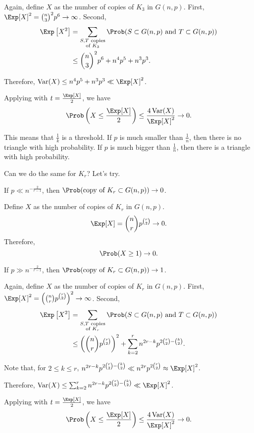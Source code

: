 \begin{dem}
	Again, define $X$ as the number of copies of $K_3$ in $G(n, p)$. First, $\Exp[X]^2 = \binom{n}{3}^2p^6 \to \infty$. Second,
	\begin{align*} \Exp\left[X^2\right] &= \sum_{\substack{S, T\text{ copies}\\\text{of }K_3}} \Prob(S \subset G(n, p) \text{ and } T \subset G(n, p)) \\
		&\le \binom{n}{3}^2p^6 + n^4p^5 + n^3p^3.
	\end{align*}

	Therefore, $\Var(X) \le n^4p^5 + n^3p^3 \ll \Exp[X]^2$.
	
	Applying  with $t = \frac{\Exp[X]}{2}$, we have
	\[
		\Prob\left(X \le \frac{\Exp[X]}{2}\right) \le \frac{4\Var(X)}{\Exp[X]^2} \to 0.
	\]
\end{dem}

This means that $\frac{1}{k}$ is a threshold. If $p$ is much smaller than $\frac{1}{n}$, then there is no triangle with high probability. If $p$ is much bigger than $\frac{1}{n}$, then there is a triangle with high probability. 

Can we do the same for $K_r$? Let's try.

\begin{prop}
	If $p \ll n^{-\frac{2}{r-1}}$, then $\Prob(\text{copy of } K_r \subset G(n, p)) \to 0$.
\end{prop}

\begin{dem}
	Define $X$ as the number of copies of $K_r$ in $G(n, p)$. \[ \Exp[X] = \binom{n}{r} p^{\binom{r}{2}} \to 0.\]
	Therefore, \[ \Prob(X \ge 1) \to 0.\]	
\end{dem}


\begin{prop}
	If $p \gg n^{-\frac{2}{r-1}}$, then $\Prob(\text{copy of } K_r \subset G(n, p)) \to 1$.		
\end{prop}

\begin{dem}
	Again, define $X$ as the number of copies of $K_r$ in $G(n, p)$. First, $\Exp[X]^2 = \left(\binom{n}{r}p^{\binom{r}{2}}\right)^2 \to \infty$. Second,
	\begin{align*} \Exp\left[X^2\right] &= \sum_{\substack{S, T\text{ copies}\\\text{of }K_r}} \Prob(S \subset G(n, p) \text{ and } T \subset G(n, p)) \\
		&\le \left(\binom{n}{r}p^{\binom{r}{2}}\right)^2 + \sum_{k=2}^r n^{2r-k} p^{2\binom{r}{2} - \binom{k}{2}}.
	\end{align*}

	Note that, for $2 \le k \le r$, $n^{2r-k}p^{2\binom{r}{2} - \binom{k}{2}} \ll n^{2r}p^{2\binom{r}{2}} \approx \Exp[X]^2$.

	Therefore, $\Var(X) \le \sum_{k=2}^r n^{2r-k} p^{2\binom{r}{2} - \binom{k}{2}}\ll \Exp[X]^2$.
	
	Applying  with $t = \frac{\Exp[X]}{2}$, we have
	\[
		\Prob\left(X \le \frac{\Exp[X]}{2}\right) \le \frac{4\Var(X)}{\Exp[X]^2} \to 0.
	\]
\end{dem}
